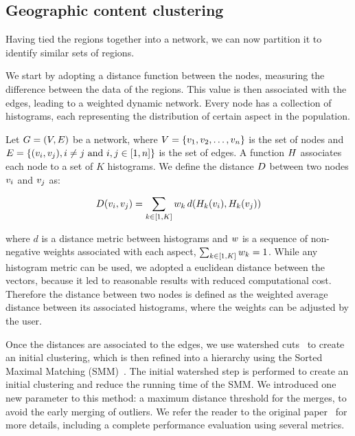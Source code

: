 \subsection{Geographic content clustering}
Having tied the regions together into a network, we can now partition it to
identify similar sets of regions. 

We start by adopting a distance function between the nodes, measuring the
difference between the data of the regions. This value is then associated with
the edges, leading to a weighted dynamic network. Every node has a collection of
histograms, each representing the distribution of certain aspect in the
population.

Let $G=(V,E)$ be a network, where
$V=\{v_1,v_2,\dots,v_n\}$ is the set of nodes and
$E=\{(v_i,v_j), i\not=j\text{ and }i,j \in [1,n]\}$ is the set of
edges. A function $H$ associates each node to a set of $K$ histograms. We
define the distance $D$ between two nodes $v_i$ and $v_j$ as:

\begin{equation}
    D(v_i,v_j)=\sum_{k \in [1,K]}{w_k\, d(H_k(v_i),H_k(v_j))}
    \label{eq:dist}
\end{equation}

\noindent where $d$ is a distance metric between histograms and $w$ is a
sequence of non-negative weights associated with each aspect,
$\sum_{k\in[1,K]}{w_k}=1$. While any histogram metric can be used, we
adopted a euclidean distance between the vectors, because it led to reasonable
results with reduced computational cost. Therefore the distance between two
nodes is defined as the weighted average distance between its associated
histograms, where the weights can be adjusted by the user.

Once the distances are associated to the edges, we use watershed
cuts~\citep{Cousty2009} to create an initial clustering, which is then refined
into a hierarchy using the Sorted Maximal Matching (SMM)~\citep{markus2017}. The
initial watershed step is performed to create an initial clustering and reduce
the running time of the SMM. We introduced one new parameter to this method: a
maximum distance threshold for the merges, to avoid the early merging of
outliers. We refer the reader to the original paper~\citep{markus2017} for more
details, including a complete performance evaluation using several metrics.


